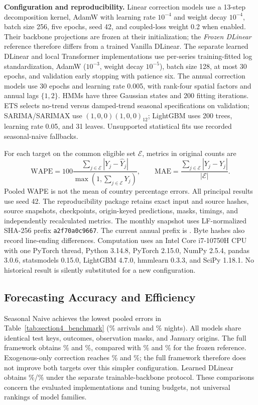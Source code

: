 \documentclass[sigconf]{acmart}
\begin{document}
\textbf{Configuration and reproducibility.} Linear correction models use a 13-step decomposition kernel, AdamW with learning rate $10^{-4}$ and weight decay $10^{-4}$, batch size 256, five epochs, seed 42, and coupled-loss weight 0.2 when enabled. Their backbone projections are frozen at their initialization; the \emph{Frozen DLinear} reference therefore differs from a trained Vanilla DLinear. The separate learned DLinear and local Transformer implementations use per-series training-fitted log standardization, AdamW ($10^{-3}$, weight decay $10^{-5}$), batch size 128, at most 30 epochs, and validation early stopping with patience six. The annual correction models use 30 epochs and learning rate 0.005, with rank-four spatial factors and annual lags $\{1,2\}$. HMMs have three Gaussian states and 200 fitting iterations. ETS selects no-trend versus damped-trend seasonal specifications on validation; SARIMA/SARIMAX use $(1,0,0)(1,0,0)_{12}$; LightGBM uses 200 trees, learning rate 0.05, and 31 leaves. Unsupported statistical fits use recorded seasonal-naive fallbacks.

For each target on the common eligible set $\mathcal E$, metrics in original counts are
\begin{equation}
\mathrm{WAPE}=100\frac{\sum_{j\in\mathcal E}|Y_j-\hat Y_j|}{\max(1,\sum_{j\in\mathcal E}Y_j)},\qquad
\mathrm{MAE}=\frac{\sum_{j\in\mathcal E}|Y_j-\hat Y_j|}{|\mathcal E|}.
\label{eq:evaluation_metrics}
\end{equation}
Pooled WAPE is not the mean of country percentage errors. All principal results use seed 42. The reproducibility package retains exact input and source hashes, source snapshots, checkpoints, origin-keyed predictions, masks, timings, and independently recalculated metrics. The monthly snapshot uses LF-normalized SHA-256 prefix \texttt{a2f70a0c9667}. The current annual prefix is \texttt{\ResultAnnualHash}. Byte hashes also record line-ending differences. Computation uses an Intel Core i7-10750H CPU with one PyTorch thread, Python 3.14.8, PyTorch 2.15.0, NumPy 2.5.4, pandas 3.0.6, statsmodels 0.15.0, LightGBM 4.7.0, hmmlearn 0.3.3, and SciPy 1.18.1. No historical result is silently substituted for a new configuration.

\subsection{Forecasting Accuracy and Efficiency}
\label{sec:accuracy_efficiency}
Seasonal Naive achieves the lowest pooled errors in Table~\ref{tab:section4_benchmark} (\ResultNaiveArrWAPE\% arrivals and \ResultNaiveNigWAPE\% nights). All models share identical test keys, outcomes, observation masks, and January origins. The full framework obtains \ResultFullArrWAPE\% and \ResultFullNigWAPE\%, compared with \ResultFrozenArrWAPE\% and \ResultFrozenNigWAPE\% for the frozen reference. Exogenous-only correction reaches \ResultExoArrWAPE\% and \ResultExoNigWAPE\%; the full framework therefore does not improve both targets over this simpler configuration. Learned DLinear obtains \ResultLearnedArrWAPE\%/\ResultLearnedNigWAPE\% under the separate trainable-backbone protocol. These comparisons concern the evaluated implementations and tuning budgets, not universal rankings of model families.
\end{document}
